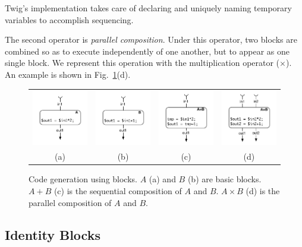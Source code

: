 Twig's implementation takes care of declaring and uniquely naming temporary variables to accomplish sequencing.

The second operator is \emph{parallel composition}. Under this operator, two blocks are combined so as to execute independently of one another, but to appear as one single block. We represent this operation with the multiplication operator ($\times$). An example is shown in Fig.~\ref{fig:codegen}(d).

\begin{figure}[ht]
\centering
\begin{tabular}{cccc}
\includegraphics[width=1.1in]{images/codegen-a}& 
\includegraphics[width=1.1in]{images/codegen-b}& 
\includegraphics[width=1.1in]{images/codegen-seq}& 
\includegraphics[width=1.1in]{images/codegen-par}\\
(a)&(b)&(c)&(d)\\
\end{tabular}
\caption{Code generation using blocks. $A$ (a) and $B$ (b) are basic blocks. $A+B$ (c) is the sequential composition of $A$ and $B$. $A \times B$ (d) is the parallel composition of $A$ and $B$.}
\label{fig:codegen}
\end{figure}

\subsection{Identity Blocks}


